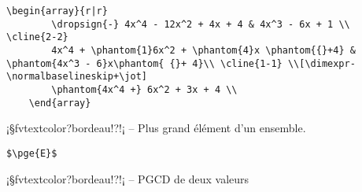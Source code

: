 \documentclass[11pt,a4paper,rgb]{report}
\begin{document}
\colorbox{blue!15}{}
\hfill
\begin{minipage}{.55\textwidth}
	\begin{lstlisting}[linewidth=\textwidth, language={[LaTeX]TeX}]
	\begin{array}{r|r}
		\dropsign{-} 4x^4 - 12x^2 + 4x + 4 & 4x^3 - 6x + 1 \\ \cline{2-2}
		4x^4 + \phantom{1}6x^2 + \phantom{4}x \phantom{{}+4} & \phantom{4x^3 - 6}x\phantom{ {}+ 4}\\ \cline{1-1} \\[\dimexpr-\normalbaselineskip+\jot]
		\phantom{4x^4 +} 6x^2 + 3x + 4 \\
	\end{array}
	\end{lstlisting}
\end{minipage}

\setlength{\leftskip}{0pt}
\setlength{\textwidth}{18cm}%


\vspace*{.75cm}

\inCodeStub¡§fvtextcolor?bordeau!?!¡ -- Plus grand élément d'un ensemble.

\setlength{\leftskip}{.75cm}%
\setlength{\textwidth}{17.25cm}%

\colorbox{blue!15}{}
\hfill
\begin{minipage}{.65\textwidth}
	\begin{lstlisting}[linewidth=\textwidth, language={[LaTeX]TeX}]
	$\pge{E}$
	\end{lstlisting}
\end{minipage}

\setlength{\leftskip}{0pt}
\setlength{\textwidth}{18cm}%


\vspace*{.75cm}

\inCodeStub¡§fvtextcolor?bordeau!?!¡ -- PGCD de deux valeurs
\end{document}
